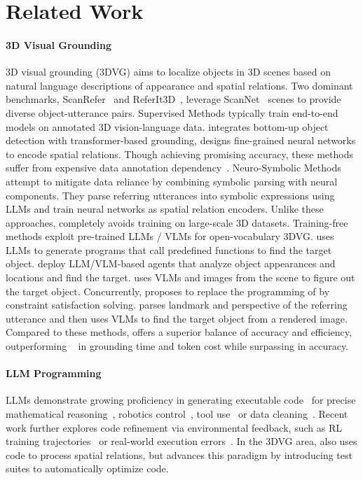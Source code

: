 \section{Related Work}
\paragraph{3D Visual Grounding}
3D visual grounding (3DVG) aims to localize objects in 3D scenes based on natural language descriptions of appearance and spatial relations. 
Two dominant benchmarks, ScanRefer~\citep{chen2020scanrefer} and ReferIt3D~\citep{achlioptas2020referit3d}, leverage ScanNet~\citep{dai2017scannet} scenes to provide diverse object-utterance pairs. 
Supervised Methods typically train end-to-end models on annotated 3D vision-language data. 
\cite{jain2022bottom} integrates bottom-up object detection with transformer-based grounding, 
\cite{chen2022language} designs fine-grained neural networks to encode spatial relations.
Though achieving promising accuracy, these methods suffer from expensive data annotation dependency~\citep{3dvista}.
Neuro-Symbolic Methods~\citep{hsu2023ns3d, feng2024naturally, li2024r2g} attempt to mitigate data reliance by combining symbolic parsing with neural components. 
They parse referring utterances into symbolic expressions using LLMs and train neural networks as spatial relation encoders.
Unlike these approaches, \ourmethod completely avoids training on large-scale 3D datasets.
Training-free methods exploit pre-trained LLMs / VLMs for open-vocabulary 3DVG. 
\cite{yuan2024visual} uses LLMs to generate programs that call predefined functions to find the target object.
\cite{yang2024llm, fang2024transcrib3d} deploy LLM/VLM-based agents that analyze object appearances and locations and find the target.
\cite{xuvlm} uses VLMs and images from the scene to figure out the target object. 
Concurrently, \cite{csvg} proposes to replace the programming of \cite{yuan2024visual} by constraint satisfaction solving.
\cite{li2024seeground} parses landmark and perspective of the referring utterance and then uses VLMs to find the target object from a rendered image.
Compared to these methods, \ourmethod offers a superior balance of accuracy and efficiency, outperforming ~\cite{yang2024llm, xuvlm, fang2024transcrib3d} in grounding time and token cost while surpassing \cite{yuan2024visual} in accuracy.

\paragraph{LLM Programming}
LLMs demonstrate growing proficiency in generating executable code~\citep{roziere2023code} for precise mathematical reasoning~\citep{li2023chain}, robotics control~\citep{liang2023code}, tool use~\citep{gupta2023visual, yuan2024visual} or data cleaning~\citep{zhou2024programming}.
Recent work further explores code refinement via environmental feedback, such as RL training trajectories~\citep{ma2023eureka} or real-world execution errors~\citep{le2022coderl, chen2023teaching}.
In the 3DVG area, \cite{yuan2024visual, fang2024transcrib3d} also uses code to process spatial relations, but \ourmethod advances this paradigm by introducing test suites to automatically optimize code.

